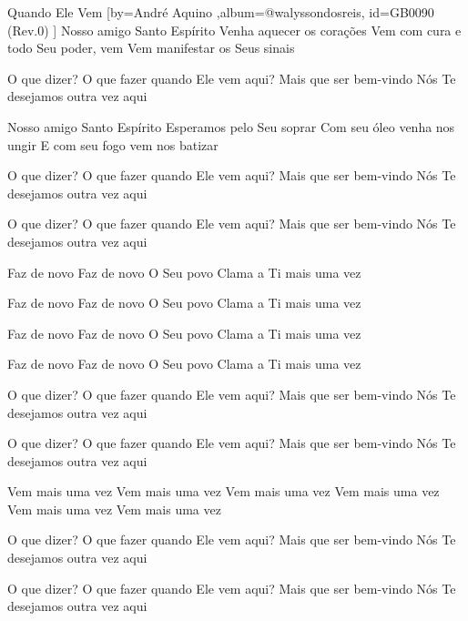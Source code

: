 \beginsong
{Quando Ele Vem %
}[by={André Aquino %
},album={@walyssondosreis},
id={GB0090 %
(Rev.0) %
}]
Nosso amigo Santo Espírito
Venha aquecer os corações
Vem com cura e todo Seu poder, vem
Vem manifestar os Seus sinais

O que dizer?
O que fazer quando Ele vem aqui?
Mais que ser bem-vindo
Nós Te desejamos outra vez aqui

Nosso amigo Santo Espírito
Esperamos pelo Seu soprar
Com seu óleo venha nos ungir
E com seu fogo vem nos batizar

O que dizer?
O que fazer quando Ele vem aqui?
Mais que ser bem-vindo
Nós Te desejamos outra vez aqui

O que dizer?
O que fazer quando Ele vem aqui?
Mais que ser bem-vindo
Nós Te desejamos outra vez aqui

Faz de novo
Faz de novo
O Seu povo
Clama a Ti mais uma vez

Faz de novo
Faz de novo
O Seu povo
Clama a Ti mais uma vez

Faz de novo
Faz de novo
O Seu povo
Clama a Ti mais uma vez

Faz de novo
Faz de novo
O Seu povo
Clama a Ti mais uma vez

O que dizer?
O que fazer quando Ele vem aqui?
Mais que ser bem-vindo
Nós Te desejamos outra vez aqui

O que dizer?
O que fazer quando Ele vem aqui?
Mais que ser bem-vindo
Nós Te desejamos outra vez aqui

Vem mais uma vez
Vem mais uma vez
Vem mais uma vez
Vem mais uma vez
Vem mais uma vez
Vem mais uma vez

O que dizer?
O que fazer quando Ele vem aqui?
Mais que ser bem-vindo
Nós Te desejamos outra vez aqui

O que dizer?
O que fazer quando Ele vem aqui?
Mais que ser bem-vindo
Nós Te desejamos outra vez aqui


